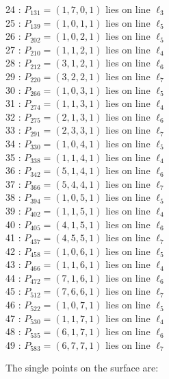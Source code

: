 \documentclass{article}
\begin{document}
{\begin{multicols}{2}
24 : $P_{131}=( 1, 7, 0, 1 )$ lies on line $\ell_{3}$\\
25 : $P_{139}=( 1, 0, 1, 1 )$ lies on line $\ell_{5}$\\
26 : $P_{202}=( 1, 0, 2, 1 )$ lies on line $\ell_{5}$\\
27 : $P_{210}=( 1, 1, 2, 1 )$ lies on line $\ell_{4}$\\
28 : $P_{212}=( 3, 1, 2, 1 )$ lies on line $\ell_{6}$\\
29 : $P_{220}=( 3, 2, 2, 1 )$ lies on line $\ell_{7}$\\
30 : $P_{266}=( 1, 0, 3, 1 )$ lies on line $\ell_{5}$\\
31 : $P_{274}=( 1, 1, 3, 1 )$ lies on line $\ell_{4}$\\
32 : $P_{275}=( 2, 1, 3, 1 )$ lies on line $\ell_{6}$\\
33 : $P_{291}=( 2, 3, 3, 1 )$ lies on line $\ell_{7}$\\
34 : $P_{330}=( 1, 0, 4, 1 )$ lies on line $\ell_{5}$\\
35 : $P_{338}=( 1, 1, 4, 1 )$ lies on line $\ell_{4}$\\
36 : $P_{342}=( 5, 1, 4, 1 )$ lies on line $\ell_{6}$\\
37 : $P_{366}=( 5, 4, 4, 1 )$ lies on line $\ell_{7}$\\
38 : $P_{394}=( 1, 0, 5, 1 )$ lies on line $\ell_{5}$\\
39 : $P_{402}=( 1, 1, 5, 1 )$ lies on line $\ell_{4}$\\
40 : $P_{405}=( 4, 1, 5, 1 )$ lies on line $\ell_{6}$\\
41 : $P_{437}=( 4, 5, 5, 1 )$ lies on line $\ell_{7}$\\
42 : $P_{458}=( 1, 0, 6, 1 )$ lies on line $\ell_{5}$\\
43 : $P_{466}=( 1, 1, 6, 1 )$ lies on line $\ell_{4}$\\
44 : $P_{472}=( 7, 1, 6, 1 )$ lies on line $\ell_{6}$\\
45 : $P_{512}=( 7, 6, 6, 1 )$ lies on line $\ell_{7}$\\
46 : $P_{522}=( 1, 0, 7, 1 )$ lies on line $\ell_{5}$\\
47 : $P_{530}=( 1, 1, 7, 1 )$ lies on line $\ell_{4}$\\
48 : $P_{535}=( 6, 1, 7, 1 )$ lies on line $\ell_{6}$\\
49 : $P_{583}=( 6, 7, 7, 1 )$ lies on line $\ell_{7}$\\
\end{multicols}
The single points on the surface are:\\
}
\end{document}
